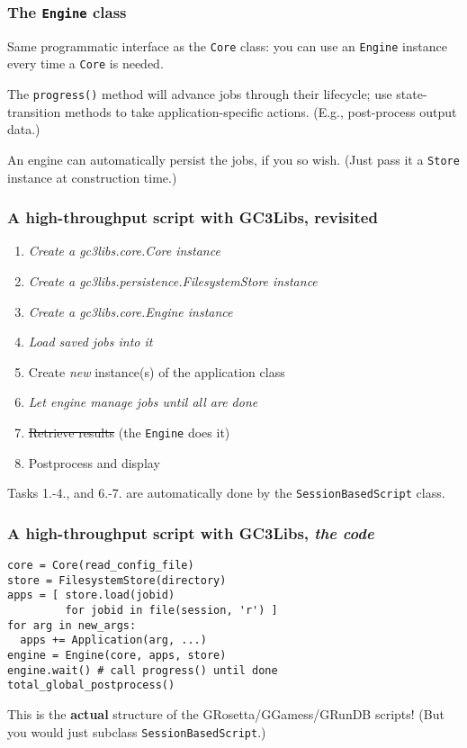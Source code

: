 \documentclass[presentation]{beamer}
\begin{document}
\begin{frame}
\frametitle{The \texttt{Engine} class}
\label{sec-20}

  Same programmatic interface as the \texttt{Core} class:
  you can use an \texttt{Engine} instance every time a \texttt{Core} is needed.

  The \texttt{progress()} method will advance jobs through their lifecycle; 
  use state-transition methods to take application-specific actions.
  (E.g., post-process output data.)
  
  An engine can automatically persist the jobs, if you so wish.
  (Just pass it a \texttt{Store} instance at construction time.)
\end{frame}
\begin{frame}
\frametitle{A high-throughput script with GC3Libs, revisited}
\label{sec-21}

\begin{enumerate}
\item \emph{Create a gc3libs.core.Core instance}
\item \emph{Create a gc3libs.persistence.FilesystemStore instance}
\item \emph{Create a gc3libs.core.Engine instance}
\item \emph{Load saved jobs into it}
\item Create \emph{new} instance(s) of the application class
\item \emph{Let engine manage jobs until all are done}
\item \st{Retrieve results} (the \texttt{Engine} does it)
\item Postprocess and display
\end{enumerate}

  Tasks 1.-4., and 6.-7. are automatically done by the
  \texttt{SessionBasedScript} class.
\end{frame}
\begin{frame}[fragile]
\frametitle{A high-throughput script with GC3Libs, \emph{the code}}
\label{sec-22}

\begin{verbatim}
core = Core(read_config_file)
store = FilesystemStore(directory)
apps = [ store.load(jobid) 
         for jobid in file(session, 'r') ]
for arg in new_args:
  apps += Application(arg, ...)
engine = Engine(core, apps, store)
engine.wait() # call progress() until done
total_global_postprocess()
\end{verbatim}

  This is the \textbf{actual} structure of the GRosetta/GGamess/GRunDB
  scripts!   (But you would just subclass \texttt{SessionBasedScript}.)
\end{frame}
\end{document}
